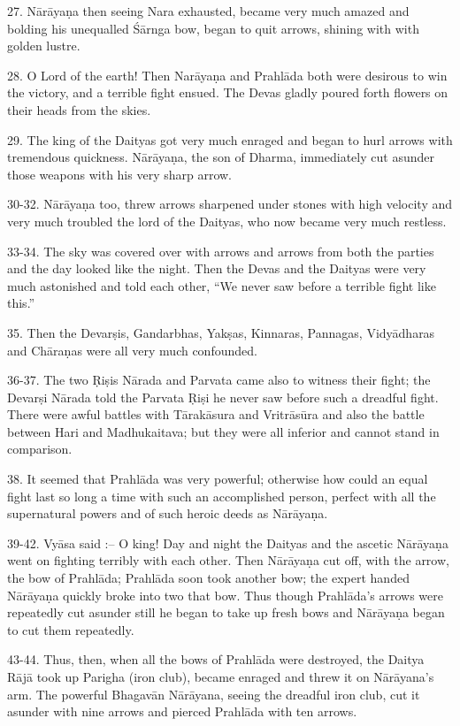 27. N\=ar\=aya\d{n}a then seeing Nara exhausted, became very much amazed and bolding his unequalled \'S\=arnga bow, began to quit arrows, shining with with golden lustre.

28. O Lord of the earth! Then Nar\=aya\d{n}a and Prahl\=ada both were desirous to win the victory, and a terrible fight ensued. The Devas gladly poured forth flowers on their heads from the skies.

29. The king of the Daityas got very much enraged and began to hurl arrows with tremendous quickness. N\=ar\=aya\d{n}a, the son of Dharma, immediately cut asunder those weapons with his very sharp arrow.

30-32. N\=ar\=aya\d{n}a too, threw arrows sharpened under stones with high velocity and very much troubled the lord of the Daityas, who now became very much restless.

33-34. The sky was covered over with arrows and arrows from both the parties and the day looked like the night. Then the Devas and the Daityas were very much astonished and told each other, ``We never saw before a terrible fight like this.''

35. Then the Devar\d{s}is, Gandarbhas, Yak\d{s}as, Kinnaras, Pannagas, Vidy\=adharas and Ch\=ara\d{n}as were all very much confounded.

36-37. The two \d{R}i\d{s}is N\=arada and Parvata came also to witness their fight; the Devar\d{s}i N\=arada told the Parvata \d{R}i\d{s}i he never saw before such a dreadful fight. There were awful battles with T\=arak\=asura and Vritr\=as\=ura and also the battle between Hari and Madhukaitava; but they were all inferior and cannot stand in comparison.

38. It seemed that Prahl\=ada was very powerful; otherwise how could an equal fight last so long a time with such an accomplished person, perfect with all the supernatural powers and of such heroic deeds as N\=ar\=aya\d{n}a.

39-42. Vy\=asa said :-- O king! Day and night the Daityas and the ascetic N\=ar\=aya\d{n}a went on fighting terribly with each other. Then N\=ar\=aya\d{n}a cut off, with the arrow, the bow of Prahl\=ada; Prahl\=ada soon took another bow; the expert handed N\=ar\=aya\d{n}a quickly broke into two that bow. Thus though Prahl\=ada's arrows were repeatedly cut asunder still he began to take up fresh bows and N\=ar\=aya\d{n}a began to cut them repeatedly.

43-44. Thus, then, when all the bows of Prahl\=ada were destroyed, the Daitya R\=aj\=a took up Parigha (iron club), became enraged and threw it on N\=ar\=ayana's arm. The powerful Bhagav\=an N\=ar\=ayana, seeing the dreadful iron club, cut it asunder with nine arrows and pierced Prahl\=ada with ten arrows.

